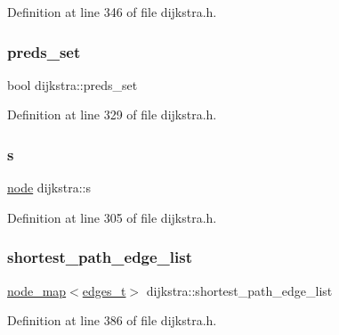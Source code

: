 Definition at line 346 of file dijkstra.\+h.

\mbox{\label{classdijkstra_aaba530e703b5d4005b3c01fa1a11182d}} 
\subsubsection{\texorpdfstring{preds\+\_\+set}{preds\_set}}
{\footnotesize\ttfamily bool dijkstra\+::preds\+\_\+set\hspace{0.3cm}{\ttfamily [private]}}



Definition at line 329 of file dijkstra.\+h.

\mbox{\label{classdijkstra_a721bfb648626a1be2b9d276d85ebdb9d}} 
\subsubsection{\texorpdfstring{s}{s}}
{\footnotesize\ttfamily \mbox{\hyperlink{classnode}{node}} dijkstra\+::s\hspace{0.3cm}{\ttfamily [private]}}



Definition at line 305 of file dijkstra.\+h.

\mbox{\label{classdijkstra_a4c647f083ee4d12327e5c1ea3bf2e7c2}} 
\subsubsection{\texorpdfstring{shortest\+\_\+path\+\_\+edge\+\_\+list}{shortest\_path\_edge\_list}}
{\footnotesize\ttfamily \mbox{\hyperlink{classnode__map}{node\+\_\+map}}$<$\mbox{\hyperlink{edge_8h_a8f9587479bda6cf612c103494b3858e3}{edges\+\_\+t}}$>$ dijkstra\+::shortest\+\_\+path\+\_\+edge\+\_\+list\hspace{0.3cm}{\ttfamily [private]}}



Definition at line 386 of file dijkstra.\+h.

